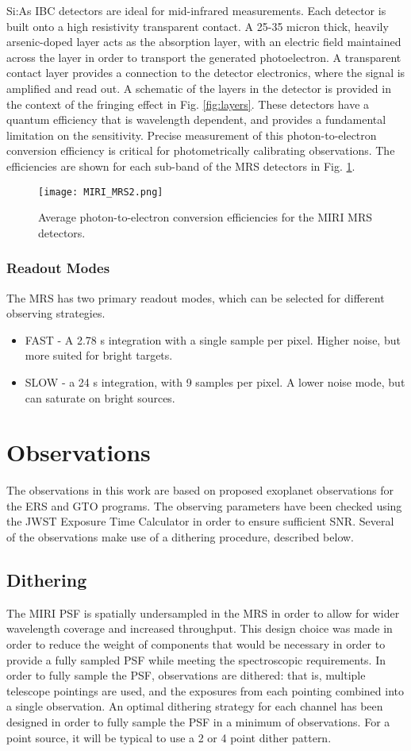 Si:As IBC detectors are ideal for mid-infrared measurements.
Each detector is built onto a high resistivity transparent contact. 
A 25-35 micron thick, heavily arsenic-doped layer acts as the absorption layer, with an electric field maintained across the layer in order to transport the generated photoelectron.
A transparent contact layer provides a connection to the detector electronics, where the signal is amplified and read out.
A schematic of the layers in the detector is provided in the context of the fringing effect in Fig. \ref{fig:layers}.
These detectors have a quantum efficiency that is wavelength dependent, and provides a fundamental limitation on the sensitivity.
Precise measurement of this photon-to-electron conversion efficiency is critical for photometrically calibrating observations. 
The efficiencies are shown for each sub-band of the MRS detectors in Fig. \ref{fig:mirideteff}.
\begin{figure}[t]
	\texttt{[image: MIRI\_MRS2.png]}
	\caption{Average photon-to-electron conversion efficiencies for the MIRI MRS detectors.}
	\label{fig:mirideteff}
\end{figure}
\subsubsection{Readout Modes}
The MRS has two primary readout modes, which can be selected for different observing strategies.
\begin{itemize}
	\item FAST - A 2.78 s integration with a single sample per pixel. Higher noise, but more suited for bright targets.
	\item SLOW - a 24 s integration, with 9 samples per pixel. A lower noise mode, but can saturate on bright sources.
\end{itemize}

\section{Observations}
The observations in this work are based on proposed exoplanet observations for the ERS and GTO programs.
The observing parameters have been checked using the JWST Exposure Time Calculator in order to ensure sufficient SNR.
Several of the observations make use of a dithering procedure, described below.
\subsection{Dithering}
The MIRI PSF is spatially undersampled in the MRS in order to allow for wider wavelength coverage and increased throughput.
This design choice was made in order to reduce the weight of components that would be necessary in order to provide a fully sampled PSF while meeting the spectroscopic requirements.
In order to fully sample the PSF, observations are dithered: that is, multiple telescope pointings are used, and the exposures from each pointing combined into a single observation.
An optimal dithering strategy for each channel has been designed in order to fully sample the PSF in a minimum of observations. 
For a point source, it will be typical to use a 2 or 4 point dither pattern.

